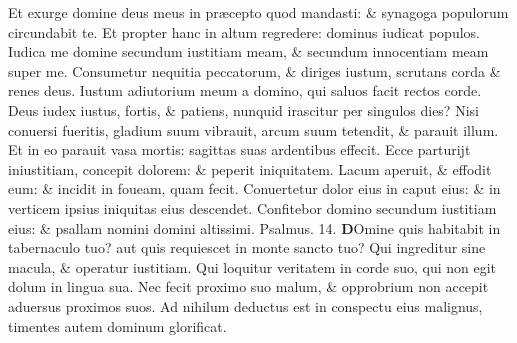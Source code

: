\documentclass[a5paper,10pt]{book}
\def\ae{æ}
\begin{document}
\begin{multicols*}{2}
\newline \color{red} E\color{black}t exurge domine deus meus in pr\ae cepto quod mandasti: \& synagoga populorum circundabit te.
\newline \color{red} E\color{black}t propter hanc in altum regredere: dominus iudicat populos.
\newline \color{red} I\color{black}udica me domine secundum iustitiam meam, \& secundum innocentiam meam super me.
\newline \color{red} C\color{black}onsumetur nequitia peccatorum, \& diriges iustum, scrutans corda \& renes deus.
\newline \color{red} I\color{black}ustum adiutorium meum a domino, qui saluos facit rectos corde.
\newline \color{red} D\color{black}eus iudex iustus, fortis, \& patiens, nunquid irascitur per singulos dies?
\newline \color{red} N\color{black}isi conuersi fueritis, gladium suum vibrauit, arcum suum tetendit, \& parauit illum.
\newline \color{red} E\color{black}t in eo parauit vasa mortis: sagittas suas ardentibus effecit.
\newline \color{red} E\color{black}cce parturijt iniustitiam, concepit dolorem: \& peperit iniquitatem.
\newline \color{red} L\color{black}acum aperuit, \& effodit eum: \& incidit in foueam, quam fecit.
\newline \color{red} C\color{black}onuertetur dolor eius in caput eius: \& in verticem ipsius iniquitas eius descendet.
\newline \color{red} C\color{black}onfitebor domino secundum iustitiam eius: \& psallam nomini domini altissimi. \quad \color{red} Psalmus. \hypertarget{ps14}{14.} \color{black}
\vspace{-.5em}
\lettrine[lines=2]{\bfseries \color{red} D}{}Omine quis habitabit in tabernaculo tuo? aut quis requiescet in monte sancto tuo?
\newline \color{red} Q\color{black}ui ingreditur sine macula, \& operatur iustitiam.
\newline \color{red} Q\color{black}ui loquitur veritatem in corde suo, qui non egit dolum in lingua sua.
\newline \color{red} N\color{black}ec fecit proximo suo malum, \& opprobrium non accepit aduersus proximos suos.
\newline \color{red} A\color{black}d nihilum deductus est in conspectu eius malignus, timentes autem dominum glorificat.

\end{multicols*}
\end{document}

